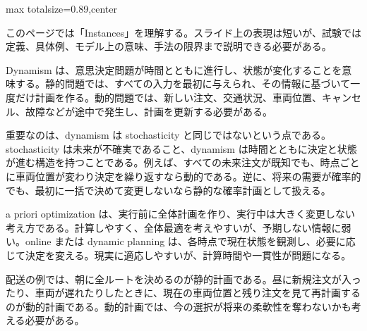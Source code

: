 \begin{minipage}[t]{0.58\textwidth}
\begin{adjustbox}{max totalsize={\textwidth}{0.89\textheight},center}
\begin{minipage}{\textwidth}\scriptsize
{}このページでは「Instances」を理解する。スライド上の表現は短いが、試験では定義、具体例、モデル上の意味、手法の限界まで説明できる必要がある。\par
Dynamism は、意思決定問題が時間とともに進行し、状態が変化することを意味する。静的問題では、すべての入力を最初に与えられ、その情報に基づいて一度だけ計画を作る。動的問題では、新しい注文、交通状況、車両位置、キャンセル、故障などが途中で発生し、計画を更新する必要がある。\par
重要なのは、dynamism は stochasticity と同じではないという点である。stochasticity は未来が不確実であること、dynamism は時間とともに決定と状態が進む構造を持つことである。例えば、すべての未来注文が既知でも、時点ごとに車両位置が変わり決定を繰り返すなら動的である。逆に、将来の需要が確率的でも、最初に一括で決めて変更しないなら静的な確率計画として扱える。\par
a priori optimization は、実行前に全体計画を作り、実行中は大きく変更しない考え方である。計算しやすく、全体最適を考えやすいが、予期しない情報に弱い。online または dynamic planning は、各時点で現在状態を観測し、必要に応じて決定を変える。現実に適応しやすいが、計算時間や一貫性が問題になる。\par
配送の例では、朝に全ルートを決めるのが静的計画である。昼に新規注文が入ったり、車両が遅れたりしたときに、現在の車両位置と残り注文を見て再計画するのが動的計画である。動的計画では、今の選択が将来の柔軟性を奪わないかも考える必要がある。\par

\end{minipage}
\end{adjustbox}
\end{minipage}
